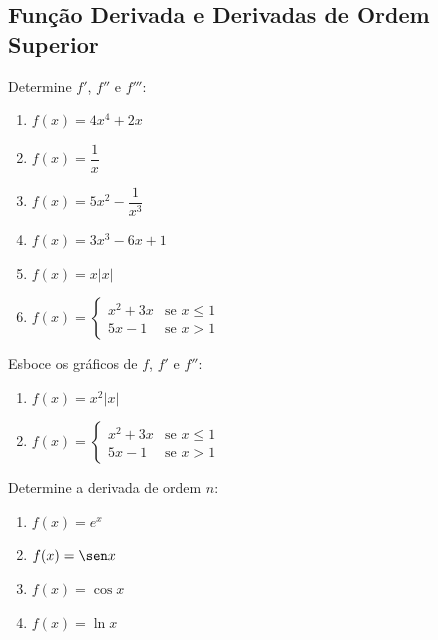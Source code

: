\clearpage

\subsection{Função Derivada e Derivadas de Ordem Superior}

\begin{exercicio}[1]
\label{ex:7.8.1}
Determine $f'$, $f''$ e $f'''$:
\begin{enumerate}[label=\alph*)]
    \item $f(x) = 4x^4 + 2x$
    \item $f(x) = \dfrac{1}{x}$
    \item $f(x) = 5x^2 - \dfrac{1}{x^3}$
    \item $f(x) = 3x^3 - 6x + 1$
    \item $f(x) = x|x|$
    \item $f(x) = \begin{cases} x^2 + 3x & \text{se } x \le 1 \\ 5x - 1 & \text{se } x > 1 \end{cases}$
\end{enumerate}
\end{exercicio}

\begin{exercicio}[2]
\label{ex:7.8.2}
Esboce os gráficos de $f$, $f'$ e $f''$:
\begin{enumerate}[label=\alph*)]
    \item $f(x) = x^2 |x|$
    \item $f(x) = \begin{cases} x^2 + 3x & \text{se } x \le 1 \\ 5x - 1 & \text{se } x > 1 \end{cases}$
\end{enumerate}
\end{exercicio}

\begin{exercicio}[3]
\label{ex:7.8.3}
Determine a derivada de ordem $n$:
\begin{enumerate}[label=\alph*)]
    \item $f(x) = e^x$
    \item $f(x) = \sen x$
    \item $f(x) = \cos x$
    \item $f(x) = \ln x$
\end{enumerate}
\end{exercicio}

